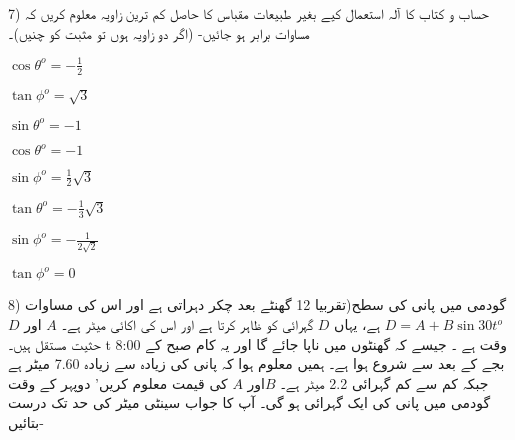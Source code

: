 7) حساب و کتاب کا آلہ استعمال کیے بغیر طبیعات مقباس کا حاصل کم ترین زاویہ معلوم کریں کہ مساوات برابر ہو جائیں- (اگر دو زاویہ ہوں تو مثبت کو چنیں)۔
\begin{enumerate}[aـ]
\begin{multicols}{4}
\item \(\cos \theta^o =-\frac{1}{2}\)
\item \(\tan \phi^o =\sqrt{3}\)
\item \(\sin \theta^o  =-1\)
\item \(\cos \theta^o =-1\)
\item \(\sin \phi^o  =\frac{1}{2} \sqrt{3}\)
\item \(\tan \theta^o =- \frac{1}{3}\sqrt{3}\)
\item \(\sin \phi^o =-\frac{1}{2 \sqrt{2}}\)
\item \(\tan \phi^o =0\)
\end{multicols}
\end{enumerate}

8) گودمی میں پانی کی سطح(تقربیا 12 گھنٹے بعد چکر دہراتی ہے اور اس کی مساوات \(D=A+B \sin 30 t^o\) ہے، یہاں \(D\) گہرائی کو ظاہر کرتا ہے اور اس کی اکائی میٹر ہے۔ \(A\) اور   \(D\) حثیت مستقل ہیں۔ t وقت ہے ۔ جیسے کہ گھنٹوں میں ناپا جائے گا اور یہ کام صبح کے 8:00 بجے کے بعد سے شروع ہوا ہے۔
ہمیں معلوم ہوا کہ پانی کی زیادہ سے زیادہ 7.60 میٹر ہے جبکہ کم سے کم گہرائی 2.2 میٹر ہے۔  \(B\)اور \(A\) کی قیمت معلوم کریں' دوپہر کے وقت گودمی میں پانی کی ایک گہرائی ہو گی۔ آپ کا جواب سینٹی میٹر کی حد تک درست بتائیں-

